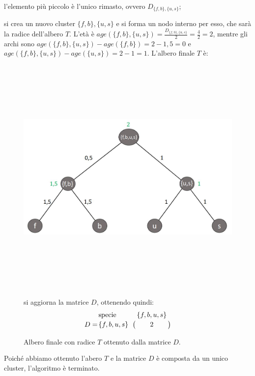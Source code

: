 \begin{itemize}
	\item l'elemento più piccolo è l'unico rimasto, ovvero $D_{\{f, b\}, \{u, s\}}$;
	\item si crea un nuovo cluster $\{f, b\}, \{u, s\}$ e si forma un nodo interno per esso, che sarà la radice dell'albero $T$. L'età è $age(\{f, b\}, \{u, s\})=\frac{D_{\{f, b\}, \{u, s\}}}{2}=\frac{4}{2}=2$, mentre gli archi sono $age(\{f, b\}, \{u, s\})-age(\{f, b\})=2-1,5=0$ e $age(\{f, b\}, \{u, s\})-age(\{u, s\})=2-1=1$. 
	\newline
	L'albero finale $T$ è:
	\begin{figure}[h!]
\centering
	\includegraphics[height=12cm, width=14cm,keepaspectratio]{rooted_upgma_7.jpg}
 	\caption{Albero finale con radice $T$ ottenuto dalla matrice $D$.}
  	\label{fig:rooted_upgma_7}
  	\item si aggiorna la matrice $D$, ottenendo quindi:
  		\[
  		D = \bordermatrix{\text{specie}&\{f, b, u, s\}\cr
                \{f, b, u ,s\}& 2}
                \]
\end{figure}
\end{itemize}
Poiché abbiamo ottenuto l'abero $T$ e la matrice $D$ è composta da un unico cluster, l'algoritmo è terminato.

\newpage

